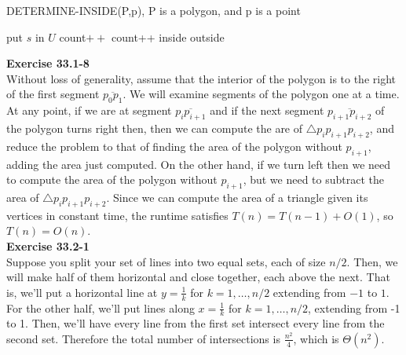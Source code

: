 \documentclass{article}
\begin{document}
\begin{algorithm}
\caption{DETERMINE-INSIDE(P,p), P is a polygon, and p is a point}
\begin{algorithmic}
\State put $s$ in $U$
\EndIf
\State count$++$
\EndFor
{}
\State count++
\EndIf
\EndFor
{}
\State \Return inside
\Else
\State \Return outside
\EndIf
\end{algorithmic}
\end{algorithm}

\noindent\textbf{Exercise 33.1-8}\\

Without loss of generality, assume that the interior of the polygon is to the right of the first segment $\overline{p_0p_1}$.  We will examine segments of the polygon one at a time.  At any point, if we are at segment $\overline{p_i p_{i+1}}$ and if the next segment $\overline{p_{i+1} p_{i+2}}$ of the polygon turns right then, then we can compute the are of $\triangle p_i p_{i+1} p_{i+2}$, and reduce the problem to that of finding the area of the polygon without $p_{i+1}$, adding the area just computed.  On the other hand, if we turn left then we need to compute the area of the polygon without $p_{i+1}$, but we need to subtract the area of $\triangle p_i p_{i+1} p_{i+2}$.  Since we can compute the area of a triangle given its vertices in constant time, the runtime satisfies $T(n) = T(n-1) + O(1)$, so $T(n) = O(n)$. \\


\noindent\textbf{Exercise 33.2-1}\\

Suppose you split your set of lines into two equal sets, each of size $n/2$. Then, we will make half of them horizontal and close together, each above the next. That is, we'll put a horizontal line at $y = \frac{1}{k}$ for $k=1,\ldots, n/2$ extending from $-1$ to $1$. For the other half, we'll put lines along $x= \frac{1}{k}$ for $k=1,\ldots,n/2$, extending from -1 to 1. Then, we'll have every line from the first set intersect every line from the second set. Therefore the total number of intersections is $\frac{n^2}{4}$, which is $\Theta(n^2)$.\\
\end{document}
